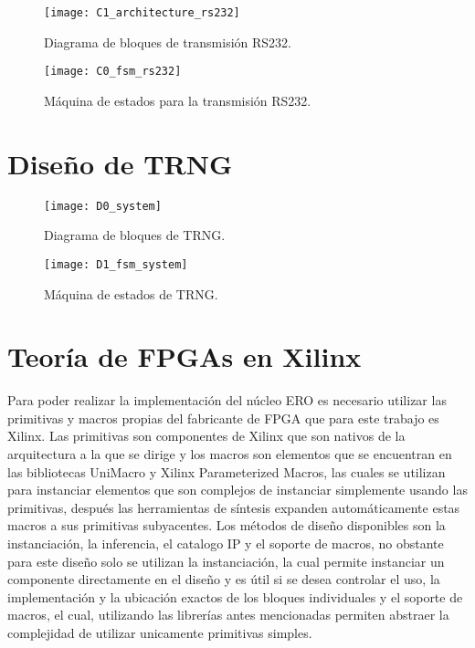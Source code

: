         \begin{figure}[hbtp]
            \caption{Diagrama de bloques de transmisión RS232.}
            \centering
            \texttt{[image: C1\_architecture\_rs232]}
            \label{fig:C1_architecture_rs232}
        \end{figure}

        \begin{figure}[hbtp]
            \caption{Máquina de estados para la transmisión RS232.}
            \centering
            \texttt{[image: C0\_fsm\_rs232]}
            \label{fig:C0_fsm_rs232}
        \end{figure}	

    \section{Diseño de TRNG}

        \begin{figure}[hbtp]
            \caption{Diagrama de bloques de TRNG.}
            \centering
            \texttt{[image: D0\_system]}
            \label{fig:D0_system}
        \end{figure}

        \begin{figure}[hbtp]
            \caption{Máquina de estados de TRNG.}
            \centering
            \texttt{[image: D1\_fsm\_system]}
            \label{fig:D1_fsm_system}
        \end{figure}






    \section{Teoría de FPGAs en Xilinx}
        Para poder realizar la implementación del núcleo ERO es necesario utilizar las primitivas y macros propias del fabricante de FPGA que para este trabajo es Xilinx. Las primitivas son componentes de Xilinx que son nativos de la arquitectura a la que se dirige y los macros son elementos que se encuentran en las bibliotecas UniMacro y Xilinx Parameterized Macros, las cuales se utilizan para instanciar elementos que son complejos de instanciar simplemente usando las primitivas, después las herramientas de síntesis expanden automáticamente estas macros a sus primitivas subyacentes. Los métodos de diseño disponibles son la instanciación, la inferencia, el catalogo IP y el soporte de macros, no obstante para este diseño solo se utilizan la instanciación, la cual permite instanciar un componente directamente en el diseño y es útil si se desea controlar el uso, la implementación y la ubicación exactos de los bloques individuales y el soporte de macros, el cual, utilizando las librerías antes mencionadas permiten abstraer la complejidad de utilizar unicamente primitivas simples.

